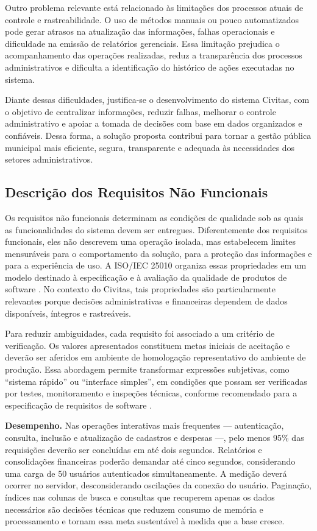 Outro problema relevante está relacionado às limitações dos processos atuais de controle e rastreabilidade. O uso de métodos manuais ou pouco automatizados pode gerar atrasos na atualização das informações, falhas operacionais e dificuldade na emissão de relatórios gerenciais. Essa limitação prejudica o acompanhamento das operações realizadas, reduz a transparência dos processos administrativos e dificulta a identificação do histórico de ações executadas no sistema.

Diante dessas dificuldades, justifica-se o desenvolvimento do sistema Civitas, com o objetivo de centralizar informações, reduzir falhas, melhorar o controle administrativo e apoiar a tomada de decisões com base em dados organizados e confiáveis. Dessa forma, a solução proposta contribui para tornar a gestão pública municipal mais eficiente, segura, transparente e adequada às necessidades dos setores administrativos.

\subsection{Descrição dos Requisitos Não Funcionais}

Os requisitos não funcionais determinam as condições de qualidade sob as quais as funcionalidades do sistema devem ser entregues. Diferentemente dos requisitos funcionais, eles não descrevem uma operação isolada, mas estabelecem limites mensuráveis para o comportamento da solução, para a proteção das informações e para a experiência de uso. A ISO/IEC 25010 organiza essas propriedades em um modelo destinado à especificação e à avaliação da qualidade de produtos de software \parencite{ISOIEC25010_2023}. No contexto do Civitas, tais propriedades são particularmente relevantes porque decisões administrativas e financeiras dependem de dados disponíveis, íntegros e rastreáveis.

Para reduzir ambiguidades, cada requisito foi associado a um critério de verificação. Os valores apresentados constituem metas iniciais de aceitação e deverão ser aferidos em ambiente de homologação representativo do ambiente de produção. Essa abordagem permite transformar expressões subjetivas, como “sistema rápido” ou “interface simples”, em condições que possam ser verificadas por testes, monitoramento e inspeções técnicas, conforme recomendado para a especificação de requisitos de software \parencite{Sommerville2018ES10}.

\textbf{Desempenho.} Nas operações interativas mais frequentes — autenticação, consulta, inclusão e atualização de cadastros e despesas —, pelo menos 95\% das requisições deverão ser concluídas em até dois segundos. Relatórios e consolidações financeiras poderão demandar até cinco segundos, considerando uma carga de 50 usuários autenticados simultaneamente. A medição deverá ocorrer no servidor, desconsiderando oscilações da conexão do usuário. Paginação, índices nas colunas de busca e consultas que recuperem apenas os dados necessários são decisões técnicas que reduzem consumo de memória e processamento e tornam essa meta sustentável à medida que a base cresce.

